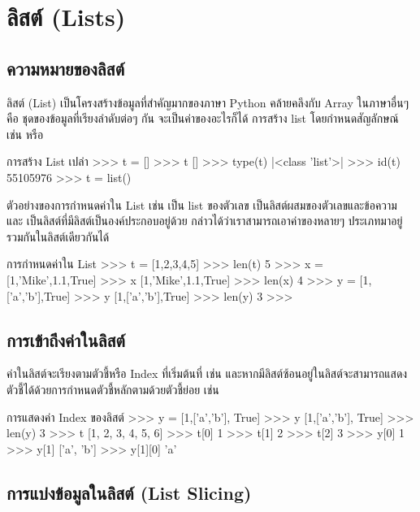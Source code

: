 \chapter{ลิสต์ (Lists)}
\section{ความหมายของลิสต์}

ลิสต์ (List) เป็นโครงสร้างข้อมูลที่สำคัญมากของภาษา Python คล้ายคลึงกับ Array ในภาษาอื่นๆ คือ ชุดของข้อมูลที่เรียงลำดับต่อๆ กัน จะเป็นค่าของอะไรก็ได้ การสร้าง list โดยกำหนดสัญลักษณ์  \pyinline{[]} เช่น   หรือ  

\begin{codelist}{การสร้าง List เปล่า}{}
>>> t = []
>>> t
[]
>>> type(t)
|<class \rq{}list\rq{}>|
>>> id(t)
55105976
>>> t = list()
\end{codelist}


ตัวอย่างของการกำหนดค่าใน List เช่น   เป็น list ของตัวเลข   เป็นลิสต์ผสมของตัวเลขและข้อความ และ   เป็นลิสต์ที่มีลิสต์เป็นองค์ประกอบอยู่ด้วย กล่าวได้ว่าเราสามารถเอาค่าของหลายๆ ประเภทมาอยู่รวมกันในลิสต์เดียวกันได้ 

\begin{codelist}{การกำหนดค่าใน List}{}
>>> t = [1,2,3,4,5]
>>> len(t)
5
>>> x = [1,'Mike',1.1,True]
>>> x
[1,'Mike',1.1,True]
>>> len(x)
4
>>> y = [1,['a','b'],True]
>>> y
[1,['a','b'],True]
>>> len(y)
3
>>>
\end{codelist}


\section{การเข้าถึงค่าในลิสต์}

ค่าในลิสต์จะเรียงตามตัวชี้หรือ Index ที่เริ่มต้นที่   เช่น  และหากมีลิสต์ซ้อนอยู่ในลิสต์จะสามารถแสดงตัวชี้ได้ด้วยการกำหนดตัวชี้หลักตามด้วยตัวชี้ย่อย เช่น 

\begin{codelist}{การแสดงค่า Index ของลิสต์}{}
>>> y = [1,['a','b'], True]
>>> y
[1,['a','b'], True]
>>> len(y)
3
>>> t
[1, 2, 3, 4, 5, 6]
>>> t[0]
1
>>> t[1]
2
>>> t[2]
3
>>> y[0]
1
>>> y[1]
['a', 'b']
>>> y[1][0]
'a'
\end{codelist}


\section{การแบ่งข้อมูลในลิสต์ (List Slicing)}

